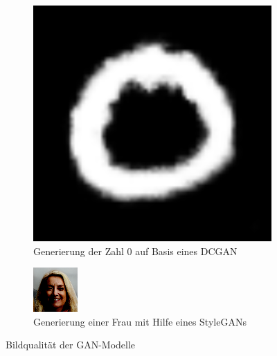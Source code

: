 \begin{figure}[H]
	\centering
	\begin{subfigure}[b]{0.35\linewidth}
		\includegraphics[width=\linewidth]{Bilder/0_mnist.png}
		\caption{Generierung der Zahl 0 auf Basis eines DCGAN}
		\label{img:gen_img_dcgan}
	\end{subfigure}
	\hspace{1cm} %
	\begin{subfigure}[b]{0.35\linewidth}
		\includegraphics[width=\linewidth]{Bilder/401_celeba.png}
		\caption{Generierung einer Frau mit Hilfe eines StyleGANs}
		\label{img:gen_img_stylegan}
	\end{subfigure}
	\caption{Bildqualität der GAN-Modelle}
	\label{img:gen_img}
\end{figure}
